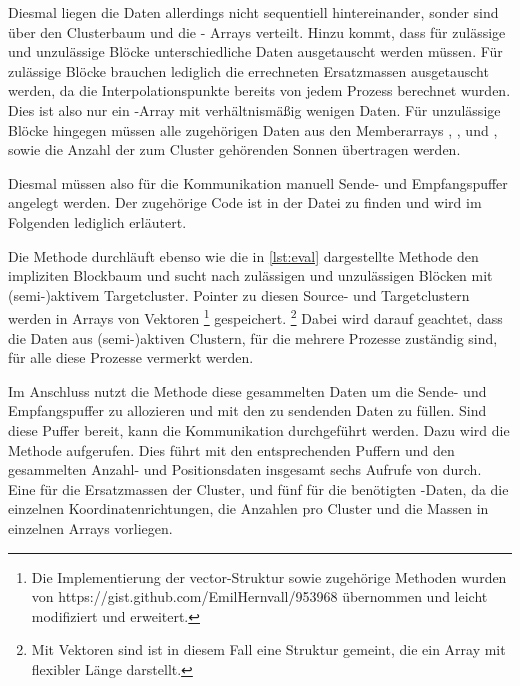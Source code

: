     Diesmal liegen die Daten allerdings nicht sequentiell hintereinander, sonder sind über den Clusterbaum und die - Arrays verteilt. Hinzu kommt, dass für zulässige und unzulässige
    Blöcke unterschiedliche Daten ausgetauscht werden müssen. Für zulässige Blöcke brauchen lediglich die errechneten Ersatzmassen ausgetauscht werden, da die Interpolationspunkte bereits von jedem 
    Prozess berechnet wurden. Dies ist also nur ein -Array mit verhältnismäßig wenigen Daten.
    Für unzulässige Blöcke hingegen müssen alle zugehörigen Daten aus den Memberarrays , ,  und , sowie die Anzahl der zum Cluster gehörenden
    Sonnen übertragen werden.
    
    Diesmal müssen also für die Kommunikation manuell Sende- und Empfangspuffer angelegt werden. Der zugehörige Code ist in der Datei  zu finden und wird im Folgenden lediglich erläutert.
    
    Die Methode  durchläuft ebenso wie die in \autoref{lst:eval} dargestellte Methode  den impliziten Blockbaum und sucht nach 
    zulässigen und unzulässigen Blöcken mit (semi-)aktivem Targetcluster. Pointer zu diesen Source- und Targetclustern werden in Arrays von Vektoren \footnote{Die Implementierung der vector-Struktur
    sowie zugehörige Methoden wurden von https://\-gist.\-github.com/\-EmilHernvall/953968 übernommen und leicht modifiziert und erweitert.} gespeichert. \footnote{Mit Vektoren sind ist in diesem Fall eine 
    Struktur gemeint, die ein Array mit flexibler Länge darstellt.} Dabei wird darauf geachtet, dass die Daten aus (semi-)aktiven Clustern, für die mehrere Prozesse zuständig sind, für alle diese 
    Prozesse vermerkt werden.
    
    Im Anschluss nutzt die Methode  diese gesammelten Daten um die Sende- und Empfangspuffer zu allozieren und mit den zu sendenden Daten zu füllen. Sind diese Puffer bereit,
    kann die Kommunikation durchgeführt werden. Dazu wird die Methode  aufgerufen. Dies führt mit den entsprechenden Puffern und den gesammelten Anzahl- und Positionsdaten
    insgesamt sechs Aufrufe von  durch. Eine für die Ersatzmassen der Cluster, und fünf für die benötigten -Daten, da die einzelnen Koordinatenrichtungen, die 
    Anzahlen pro Cluster und die Massen in einzelnen Arrays vorliegen.
    
